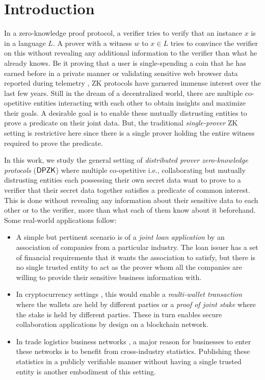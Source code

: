 \section{Introduction} \label{sec:intro}
In a zero-knowledge proof protocol, a verifier tries to verify that an instance $x$ is in a language $L$. A prover with a witness $w$ to $x \in L$ tries to convince the verifier on this without revealing any additional information to the verifier than what he already knows. Be it proving that a user is single-spending a coin that he has earned before in a private manner \cite{zerocash} or validating sensitive web browser data reported during telemetry \cite{MozillaPrio}, ZK protocols have garnered immense interest over the last few years. Still in the dream of a decentralized world, there are multiple co-opetitive entities interacting with each other to obtain insights and maximize their goals. A desirable goal is to enable these mutually distrusting entities to prove a predicate on their joint data. But, the traditional \textit{single-prover} ZK setting is restrictive here since there is a single prover holding the entire witness required to prove the predicate. 

In this work, we study the general setting of \textit{distributed prover zero-knowledge protocols} ($\mathsf{DPZK}$) where multiple co-opetitive i.e., collaborating but mutually distrusting entities each possessing their own secret data want to prove to a verifier that their secret data together satisfies a predicate of common interest. This is done without revealing any information about their sensitive data to each other or to the verifier, more than what each of them know about it beforehand. Some real-world applications follow:
\begin{itemize}
\item A simple but pertinent scenario is of a \textit{joint loan application} by an association of companies from a particular industry. The loan issuer has a set of financial requirements that it wants the association to satisfy, but there is no single trusted entity to act as the prover whom all the companies are willing to provide their sensitive business information with.
\item In cryptocurrency settings \cite{bitcoin, ethereum, zerocash}, this would enable a \textit{multi-wallet transaction} where the wallets are held by different parties or a \textit{proof of joint stake} where the stake is held by different parties. These in turn enables secure collaboration applications by design on a blockchain network. %
\item In trade logistics business networks \cite{scbn, e2open, tradelens}, a major reason for businesses to enter these networks is to benefit from cross-industry statistics. Publishing these statistics in a publicly verifiable manner without having a single trusted entity is another embodiment of this setting.
\end{itemize}

